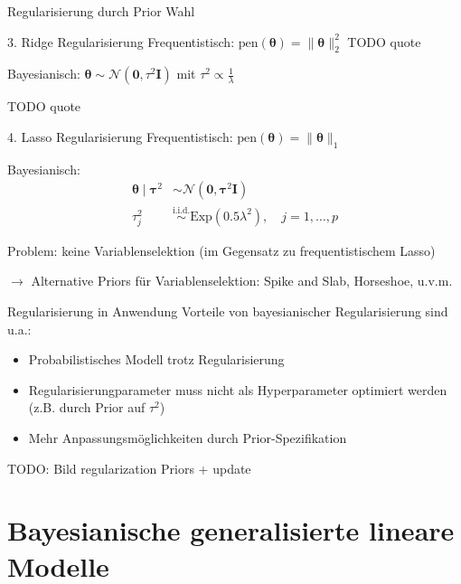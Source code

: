 \documentclass[
  ignorenonframetext,
  aspectratio=169,
]{beamer}
\providecommand{\tightlist}{%
  \setlength{\itemsep}{0pt}\setlength{\parskip}{0pt}}
\newcommand{\bnull}{\bm{0}}
\newcommand{\bI}{\bm{I}}
\newcommand{\Ncal}{\mathcal{N}}
\newcommand{\btheta}{\bm{\theta}}
\newcommand{\btaus}{\bm{\tau}^2}
\newcommand{\taus}{\tau^2}
\begin{document}
\begin{frame}{Regularisierung durch Prior Wahl}
\protect{}\label{regularisierung-durch-prior-wahl}
\begin{block}{3. Ridge Regularisierung}
\protect{}\label{ridge-regularisierung}
Frequentistisch: \(\text{pen}(\btheta) = \|\btheta\|_2^2\) TODO quote

Bayesianisch: \(\btheta \sim \Ncal(\bnull, \taus \bI)\) mit
\(\taus \propto \frac{1}{\lambda}\)

TODO quote
\end{block}

\begin{block}{4. Lasso Regularisierung}
\protect{}\label{lasso-regularisierung}
Frequentistisch: \(\text{pen}(\btheta) = \|\btheta\|_1\)

Bayesianisch: \[
\begin{aligned}
\btheta \mid \btaus &\sim \Ncal(\bnull, \btaus \bI) \\
        \taus_j &\overset{\text{i.i.d.}}{\sim} \text{Exp}(0.5 \lambda^2), \quad j = 1, \dots, p
\end{aligned}
\]
\end{block}

Problem: keine Variablenselektion (im Gegensatz zu frequentistischem
Lasso)

\(\to\) Alternative Priors für Variablenselektion: Spike and Slab,
Horseshoe, u.v.m.
\end{frame}

\begin{frame}{Regularisierung in Anwendung}
\protect{}\label{regularisierung-in-anwendung}
Vorteile von bayesianischer Regularisierung sind u.a.:

\begin{itemize}
\tightlist
\item
  Probabilistisches Modell trotz Regularisierung
\item
  Regularisierungparameter muss nicht als Hyperparameter optimiert
  werden (z.B. durch Prior auf \(\taus\))
\item
  Mehr Anpassungsmöglichkeiten durch Prior-Spezifikation
\end{itemize}

TODO: Bild regularization Priors + update
\end{frame}

\section{\texorpdfstring{Bayesianische \textbf{generalisierte} lineare
Modelle}{Bayesianische generalisierte lineare Modelle}}\label{bayesianische-generalisierte-lineare-modelle}
\end{document}
